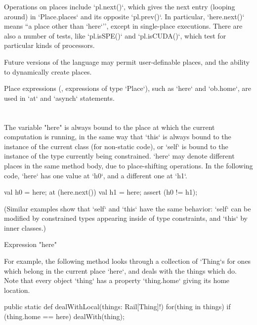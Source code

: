 Operations on places include \xcd`pl.next()`, which gives the next entry
(looping around) in \xcd`Place.places` and its opposite \xcd`pl.prev()`. In
particular, \xcd`here.next()` means ``a place other than \xcd`here`'', except
in single-place executions.
There are also a number of tests, like \xcd`pl.isSPE()` and 
\xcd`pl.isCUDA()`, which test for particular kinds of processors.

Future versions of the language may permit user-definable
places, and the ability to dynamically create places.

Place expressions  (\viz, expressions of type
\xcd`Place`), such as \xcd`here` 
and \xcd`ob.home`, are used in \xcd`at` and
\xcd`asynch` statements.  



\section{}\label{Here}

The variable \xcd"here" is always bound to the place at which the current
computation is running, in the same way that \xcd`this` is always bound to the
instance of the current class (for non-static code), or \xcd`self` is bound to
the instance of the type currently being constrained.  
\xcd`here` may denote different places in the same method body, due to
place-shifting operations. In the following code, \xcd`here` has one value at
\xcd`h0`, and a different one at \xcd`h1`. 
\begin{xten}
val h0 = here;
at (here.next()) {
  val h1 = here; 
  assert (h0 != h1);
}
\end{xten}
\noindent
(Similar examples show that \xcd`self` and \xcd`this` have the same behavior:
\xcd`self` can be modified by constrained types appearing inside of type
constraints, and \xcd`this` by inner classes.)


\begin{grammar}
Expression \: \xcd"here" \\
\end{grammar}

\begin{example}
For example, the following method looks through a collection of \xcd`Thing`s
for ones which belong in the current place \xcd`here`, and deals with the
things which do.  Note that every object \xcd`thing` has a property
\xcd`thing.home` giving its home location.
\begin{xten}
  public static def dealWithLocal(things: Rail[Thing]!) {
     for(thing in things) {
    	 if (thing.home == here) 
            dealWith(thing);
     }	  
  }
\end{xten}



\end{example}

